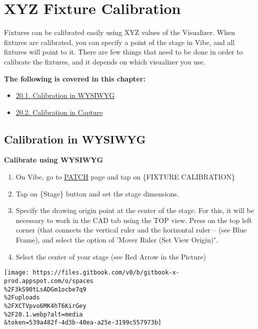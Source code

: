 \documentclass[
]{article}
\providecommand{\tightlist}{%
  \setlength{\itemsep}{0pt}\setlength{\parskip}{0pt}}
\begin{document}
\hypertarget{xyz-fixture-calibration}{%
\section{XYZ Fixture Calibration}\label{xyz-fixture-calibration}}

Fixtures can be calibrated easily using XYZ values of the Visualizer. When fixtures are calibrated, you can specify a point of the stage in Vibe, and all fixtures will point to it. There are few things that need to be done in order to calibrate the fixtures, and it depends on which visualizer you use.

\textbf{The following is covered in this chapter:}

\begin{itemize}
\tightlist
\item
  \href{https://vibemanual.compulite.com/xyz-fixture-calibration.html\#calibration-in-wysiwyg}{20.1. Calibration in WYSIWYG}
\item
  \href{https://vibemanual.compulite.com/xyz-fixture-calibration.html\#calibration-in-capture}{20.2. Calibration in Capture}
\end{itemize}

\hypertarget{calibration-in-wysiwyg}{%
\subsection{Calibration in WYSIWYG}\label{calibration-in-wysiwyg}}

\textbf{Calibrate using WYSIWYG}

\begin{enumerate}
\def\labelenumi{\arabic{enumi}.}
\item
  On Vibe, go to \protect\hyperlink{patch}{PATCH} page and tap on \{FIXTURE CALIBRATION\}
\item
  Tap on \{Stage\} button and set the stage dimensions.
\item
  Specify the drawing origin point at the center of the stage. For this, it will be necessary to work in the CAD tab using the TOP view. Press on the top left corner (that connects the vertical ruler and the horizontal ruler -- (see {Blue Frame}), and select the option of 'Mover Ruler (Set View Origin)ʼ.
\item
  Select the center of your stage (see {Red Arrow} in the Picture)
\end{enumerate}

\texttt{[image: https://files.gitbook.com/v0/b/gitbook-x-prod.appspot.com/o/spaces\\\%2F3kS90tLsADGm1ocbe7q9\\\%2Fuploads\\\%2FXCTVpvo6MK4hT6KirGey\\\%2F20.1.webp?alt=media\\\&token=539a482f-4d3b-40ea-a25e-3199c557973b]}
\end{document}
